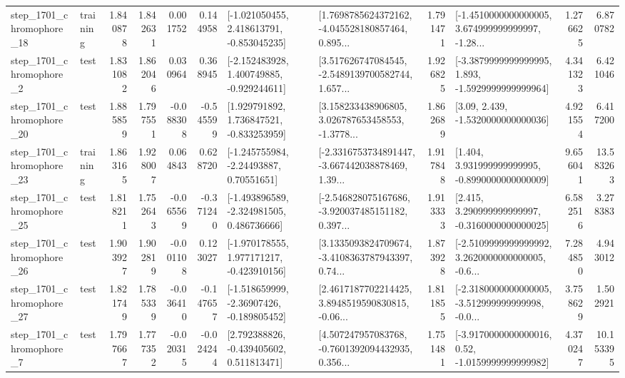 \begin{tabular}{llrrrrllrlrr}
 step\_1701\_chromophore\_18 &  training &      1.840878 &    1.842631 &      0.001752 &  0.144958 &   [-1.021050455, 2.418613791, -0.853045235] &  [1.7698785624372162, -4.045528180857464, 0.895... &       1.791471 &  [-1.4510000000000005, 3.674999999999997, -1.28... &            1.276625 &          6.870782 \\
  step\_1701\_chromophore\_2 &      test &      1.831082 &    1.862046 &      0.030964 &  0.368945 &   [-2.152483928, 1.400749885, -0.929244611] &  [3.517626747084545, -2.5489139700582744, 1.657... &       1.926825 &  [-3.3879999999999995, 1.893, -1.5929999999999964] &            4.341323 &          6.421046 \\
 step\_1701\_chromophore\_20 &      test &      1.885859 &    1.797551 &     -0.088308 & -0.545599 &    [1.929791892, 1.736847521, -0.833253959] &  [3.158233438906805, 3.026787653458553, -1.3778... &       1.862689 &                 [3.09, 2.439, -1.5320000000000036] &            4.921554 &          6.417200 \\
 step\_1701\_chromophore\_23 &  training &      1.863165 &    1.928007 &      0.064843 &  0.628720 &     [-1.245755984, -2.24493887, 0.70551651] &  [-2.3316753734891447, -3.667442038878469, 1.39... &       1.917848 &    [1.404, 3.931999999999995, -0.8990000000000009] &            9.656041 &         13.583263 \\
 step\_1701\_chromophore\_25 &      test &      1.818211 &    1.752643 &     -0.065569 & -0.371240 &   [-1.493896589, -2.324981505, 0.486736666] &  [-2.546828075167686, -3.920037485151182, 0.397... &       1.913333 &    [2.415, 3.290999999999997, -0.3160000000000025] &            6.582516 &          3.278383 \\
 step\_1701\_chromophore\_26 &      test &      1.903927 &    1.902819 &     -0.001108 &  0.123027 &   [-1.970178555, 1.977171217, -0.423910156] &  [3.1335093824709674, -3.4108363787943397, 0.74... &       1.873928 &  [-2.5109999999999992, 3.2620000000000005, -0.6... &            7.284850 &          4.943012 \\
 step\_1701\_chromophore\_27 &      test &      1.821749 &    1.785339 &     -0.036410 & -0.147657 &   [-1.518659999, -2.36907426, -0.189805452] &  [2.4617187702214425, 3.8948519590830815, -0.06... &       1.811855 &  [-2.3180000000000005, -3.512999999999998, -0.0... &            3.758629 &          1.502921 \\
  step\_1701\_chromophore\_7 &      test &      1.797667 &    1.777352 &     -0.020315 & -0.024244 &    [2.792388826, -0.439405602, 0.511813471] &  [4.507247957083768, -0.7601392094432935, 0.356... &       1.751481 &   [-3.9170000000000016, 0.52, -1.0159999999999982] &            4.370247 &         10.153395 \\

\end{tabular}
